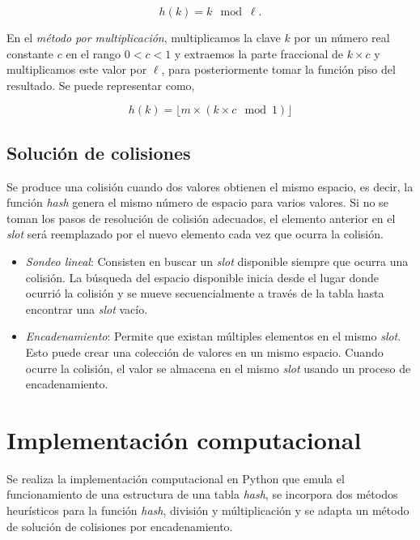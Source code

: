 \documentclass[letterpaper,11pt]{article}
\begin{document}
\begin{equation}
h(k) = k \mod \ell.
\end{equation}

En el \textit{método por multiplicación}, multiplicamos la clave $k$ por un número real constante $c$ en el rango $0<c<1$ y extraemos la parte fraccional de $k \times c$ y multiplicamos este valor por $\ell$, para posteriormente tomar la función piso del resultado. Se puede representar como,

\begin{equation}
h(k) = \lfloor m\times (k \times c \mod 1)  \rfloor
\end{equation}

\subsection{Solución de colisiones}

Se produce una colisión cuando dos valores obtienen el mismo espacio, es decir, la función \textit{hash} genera el mismo número de espacio para varios valores. Si no se toman los pasos de resolución de colisión adecuados, el elemento anterior en el \textit{slot} será reemplazado por el nuevo elemento cada vez que ocurra la colisión.

\begin{itemize}
\item \textit{Sondeo lineal}: Consisten en buscar un \textit{slot} disponible siempre que ocurra una colisión. La búsqueda del espacio disponible inicia desde el lugar donde ocurrió la colisión y se mueve secuencialmente a través de la tabla hasta encontrar una \textit{slot} vacío.

\item \textit{Encadenamiento}: Permite que existan múltiples elementos en el mismo \textit{slot}. Esto puede crear una colección de valores en un mismo espacio. Cuando ocurre la colisión, el valor se almacena en el mismo \textit{slot} usando un proceso de encadenamiento.

\end{itemize}

\section{Implementación computacional}

Se realiza la implementación computacional en Python que emula el funcionamiento de una estructura de una tabla \textit{hash}, se incorpora dos métodos heurísticos para la función \textit{hash}, división y múltiplicación y se adapta un método de solución de colisiones por encadenamiento.
\end{document}
